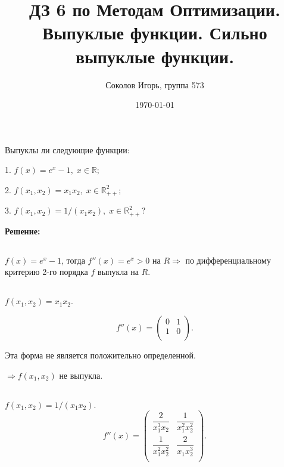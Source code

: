 \documentclass[a4paper,12pt]{article}
\author{Соколов Игорь, группа 573}
\title{ДЗ 6 по Методам Оптимизации. \newline Выпуклые функции. Сильно выпуклые функции.}
\date{\today}
\newcommand{\dfr}{\dfrac}
\begin{document}

\maketitle



\section{}

Выпуклы ли следующие функции: 

1. $f(x) = e^x - 1, \; x \in \mathbb{R};\;\;\; $

2. $f(x_1, x_2) = x_1x_2, \; x \in \mathbb{R}^2_{++};\;\;\; $

3. $f(x_1, x_2) = 1/(x_1x_2), \; x \in \mathbb{R}^2_{++}$?

\vspace{\baselineskip}

\textbf{Решение:}

\vspace{\baselineskip}

\subsection{}
 $f(x) = e^x - 1$, тогда $f''(x) = e^x > 0$ на $R \Rightarrow$ по дифференциальному критерию 2-го порядка $f$ выпукла на $R$.


\subsection{}
$f(x_1, x_2) = x_1x_2$. 

$$
f''(x) = 
\begin{pmatrix}
0 & 1 \\
1 & 0 \\
\end{pmatrix}.
$$

Эта форма не является положительно определенной. 

$\Rightarrow f(x_1,x_2)$  не выпукла.

\subsection{}

$f(x_1, x_2) = 1/(x_1 x_2)$.
$$
f''(x) = 
\begin{pmatrix}
\dfr{2}{x_1^3x_2} & \dfr{1}{x_1^2x_2^2} \\
\dfr{1}{x_1^2x_2^2} & \dfr{2}{x_1x_2^3} \\
\end{pmatrix}.
$$
\end{document}
